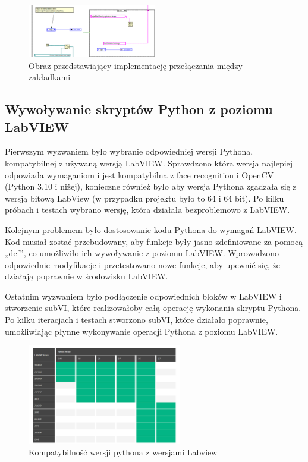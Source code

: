 \documentclass{report}
\begin{document}
\begin{figure}[H]
    \centering
    \includegraphics[width=0.5\textwidth]{src/tab-control-page.png}
    \caption{Obraz przedstawiający implementację przełączania między zakładkami}
    \label{fig:tab-control-page}
\end{figure}



\subsection{\Large Wywoływanie skryptów Python z poziomu LabVIEW}

%
%
Pierwszym wyzwaniem było wybranie odpowiedniej wersji Pythona, kompatybilnej z używaną wersją LabVIEW. Sprawdzono która wersja najlepiej odpowiada wymaganiom i jest kompatybilna z face recognition i OpenCV (Python 3.10 i niżej), konieczne również było aby wersja Pythona zgadzała się z wersją bitową LabView (w przypadku projektu było to 64 i 64 bit). Po kilku próbach i testach wybrano wersję, która działała bezproblemowo z LabVIEW.

Kolejnym problemem było dostosowanie kodu Pythona do wymagań LabVIEW. Kod musiał zostać przebudowany, aby funkcje były jasno zdefiniowane za pomocą „def”, co umożliwiło ich wywoływanie z poziomu LabVIEW. Wprowadzono odpowiednie modyfikacje i przetestowano nowe funkcje, aby upewnić się, że działają poprawnie w środowisku LabVIEW.

Ostatnim wyzwaniem było podłączenie odpowiednich bloków w LabVIEW i stworzenie subVI, które realizowałoby całą operację wykonania skryptu Pythona.  Po kilku iteracjach i testach stworzono subVI, które działało poprawnie, umożliwiając płynne wykonywanie operacji Pythona z poziomu LabVIEW.
\begin{figure}[H]
    \centering
    \includegraphics[width=0.6\textwidth]{src/python-v.png}
    \caption{Kompatybilność wersji pythona z wersjami Labview}
    \label{fig:python-version}
\end{figure}
\end{document}

